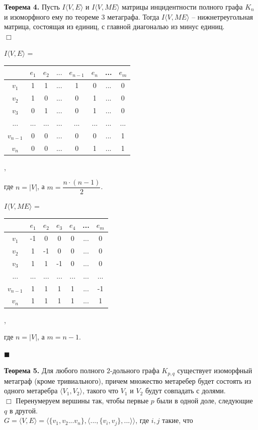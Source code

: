 \textbf{Теорема 4.} Пусть $I\langle V,E \rangle$ и $I\langle V, ME\rangle$ матрицы инцидентности полного графа $K_n$ и изоморфного ему по теореме 3 метаграфа. Тогда $I\langle V, ME\rangle$ -- нижнетреугольная матрица, состоящая из единиц, с главной диагональю из минус единиц.\\
$\Box$ \begin{center}
 $I\langle V,E \rangle$ = \begin{tabular}{c|ccccccc|}
&$e_1$ &$ e_2$ & $...$ & $e_{n-1}$ & $e_n$ & ... & $e_m$ \\ \hline
$v_1$ & 1 & 1 & ... & 1 & 0 & ... & 0 \\ 
$v_2$ & 1 & 0 & ... & 0 & 1 & ... & 0 \\ 
$v_3$ & 0 & 1 & ... & 0 & 1 & ... & 0 \\ 
... & ... & ... & ... & ... & ... & ... & ... \\ 
$v_{n-1} $&0 & 0 & ... & 0 & 0 & ... & 1 \\ 
$v_{n}$ & 0 & 0 & ... & 0 & 1 & ... & 1 \\ 
\end{tabular},
\end{center}
где $n = |V|$, а $m = \dfrac{n\cdot(n-1)}{2}$. 
\begin{center}
$I\langle V, ME\rangle$ = \begin{tabular}{c|cccccc|}
&$e_1$ &$ e_2$ & $e_3$ & $e_4$ & ... & $e_m$ \\ \hline
$v_1$ & -1 & 0 & 0 &0& ... & 0 \\ 
$v_2$ & 1 & -1 & 0 &0& ... & 0 \\ 
$v_3$ & 1 & 1 & -1 &0& ... & 0 \\ 
... & ... & ... &...& ... & ... & ... \\ 
$v_{n-1} $&1 & 1 & 1& 1 & ... & -1 \\ 
$v_{n}$ & 1 & 1 & 1&1 & ... & 1 \\ 
\end{tabular},
\end{center}
где $n = |V|$, а $m=n-1$. 
\vspace{-0.6cm}
\begin{flushright}
$\blacksquare$
\end{flushright}
\vspace{-0.6cm}

\textbf{Теорема 5.} Для любого полного $2$-дольного графа $K_{p,q}$ существует изоморфный метаграф (кроме тривиального), причем множество метаребер будет состоять из одного метаребра $\langle V_1, V_2\rangle$, такого что $V_1$ и $V_2$ будут совпадать с долями.
\\$\Box$ Перенумеруем вершины так, чтобы первые $p$ были в одной доле, следующие $q$ в другой.
\\$G=\langle V,E \rangle=\Big \langle\{v_1,v_2...v_n \},\big\langle ..., \{ v_i, v_j \},...\big\rangle \Big\rangle$, где $i, j$ такие, что

